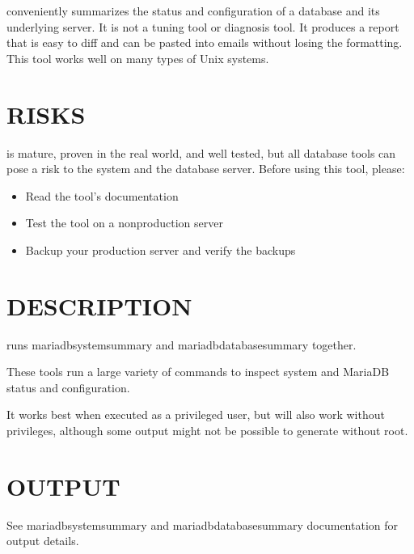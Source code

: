 \documentclass[letterpaper,10pt,english]{sphinxmanual}
\begin{document}
\sphinxAtStartPar
{} conveniently summarizes the status and configuration of
a database and its underlying server. It is not a tuning tool or diagnosis tool.
It produces a report that is easy to diff and can be pasted into emails without
losing the formatting. This tool works well on many types of Unix systems.


\section{RISKS}
\label{\detokenize{mariadb-summary:risks}}
\sphinxAtStartPar
{} is mature, proven in the real world, and well tested,
but all database tools can pose a risk to the system and the database
server.  Before using this tool, please:
\begin{itemize}
\item {} 
\sphinxAtStartPar
Read the tool’s documentation

\item {} 
\sphinxAtStartPar
Test the tool on a non\sphinxhyphen{}production server

\item {} 
\sphinxAtStartPar
Backup your production server and verify the backups

\end{itemize}


\section{DESCRIPTION}
\label{\detokenize{mariadb-summary:description}}
\sphinxAtStartPar
{} runs mariadb\sphinxhyphen{}system\sphinxhyphen{}summary and mariadb\sphinxhyphen{}database\sphinxhyphen{}summary together.

\sphinxAtStartPar
These tools run a large variety of commands to inspect system and MariaDB
status and configuration.

\sphinxAtStartPar
It works best when executed as a privileged user, but will also work without
privileges, although some output might not be possible to generate without root.


\section{OUTPUT}
\label{\detokenize{mariadb-summary:output}}
\sphinxAtStartPar
See mariadb\sphinxhyphen{}system\sphinxhyphen{}summary and mariadb\sphinxhyphen{}database\sphinxhyphen{}summary documentation for output
details.
\end{document}
